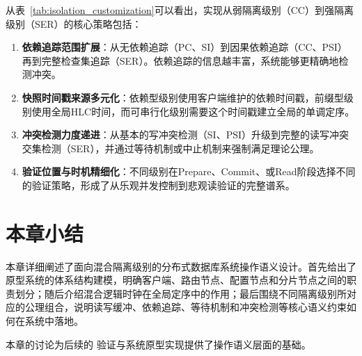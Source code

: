 从表~\ref{tab:isolation_customization}可以看出，实现从弱隔离级别（CC）到强隔离级别（SER）的核心策略包括：

\begin{enumerate}
  \item \textbf{依赖追踪范围扩展}：从无依赖追踪（PC、SI）到因果依赖追踪（CC、PSI）再到完整检查集追踪（SER）。依赖追踪的信息越丰富，系统能够更精确地检测冲突。

  \item \textbf{快照时间戳来源多元化}：依赖型级别使用客户端维护的依赖时间戳，前缀型级别使用全局HLC时间，而可串行化级别需要这个时间戳建立全局的单调定序。

  \item \textbf{冲突检测力度递进}：从基本的写冲突检测（SI、PSI）升级到完整的读写冲突交集检测（SER），并通过等待机制或中止机制来强制满足理论公理。

  \item \textbf{验证位置与时机精细化}：不同级别在Prepare、Commit、或Read阶段选择不同的验证策略，形成了从乐观并发控制到悲观读验证的完整谱系。
\end{enumerate}

\section{本章小结}

本章详细阐述了面向混合隔离级别的分布式数据库系统操作语义设计。首先给出了原型系统的体系结构建模，明确客户端、路由节点、配置节点和分片节点之间的职责划分；随后介绍混合逻辑时钟在全局定序中的作用；最后围绕不同隔离级别所对应的公理组合，说明读写缓冲、依赖追踪、等待机制和冲突检测等核心语义约束如何在系统中落地。

本章的讨论为后续的 \TLAPlus 验证与系统原型实现提供了操作语义层面的基础。
